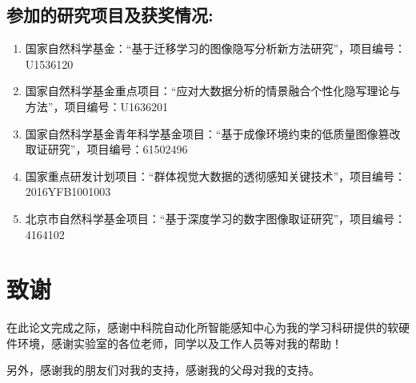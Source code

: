 \section*{参加的研究项目及获奖情况:}

\begin{enumerate}[(1)]
	\item 国家自然科学基金：“基于迁移学习的图像隐写分析新方法研究”，项目编号：U1536120

	\item 国家自然科学基金重点项目：“应对大数据分析的情景融合个性化隐写理论与方法”，项目编号：U1636201

	\item 国家自然科学基金青年科学基金项目：“基于成像环境约束的低质量图像篡改取证研究”，项目编号：61502496

	\item 国家重点研发计划项目：“群体视觉大数据的透彻感知关键技术”，项目编号：2016YFB1001003

	\item 北京市自然科学基金项目：“基于深度学习的数字图像取证研究”，项目编号：4164102

\end{enumerate}

\chapter{致\quad 谢}
在此论文完成之际，感谢中科院自动化所智能感知中心为我的学习科研提供的软硬件环境，感谢实验室的各位老师，同学以及工作人员等对我的帮助！

另外，感谢我的朋友们对我的支持，感谢我的父母对我的支持。

